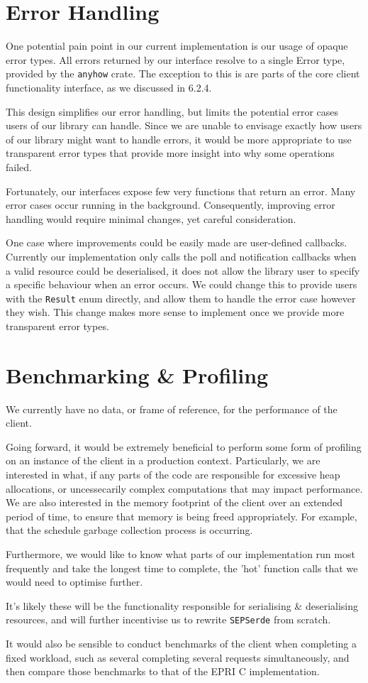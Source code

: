 \section{Error Handling}
One potential pain point in our current implementation is our usage of opaque error types. All errors returned by our interface resolve to a single Error type, provided by the \texttt{anyhow} crate. The exception to this is are parts of the core client functionality interface, as we discussed in 6.2.4.

This design simplifies our error handling, but limits the potential error cases users of our library can handle. Since we are unable to envisage exactly how users of our library might want to handle errors, it would be more appropriate to use transparent error types that provide more insight into why some operations failed.

Fortunately, our interfaces expose few very functions that return an error. Many error cases occur running in the background. Consequently, improving error handling would require minimal changes, yet careful consideration.

One case where improvements could be easily made are user-defined callbacks. Currently our implementation only calls the poll and notification callbacks when a valid resource could be deserialised, it does not allow the library user to specify a specific behaviour when an error occurs. We could change this to provide users with the \texttt{Result} enum directly, and allow them to handle the error case however they wish. This change makes more sense to implement once we provide more transparent error types.   

\section{Benchmarking \& Profiling}
We currently have no data, or frame of reference, for the performance of the client. 

Going forward, it would be extremely beneficial to perform some form of profiling on an instance of the client in a production context. Particularly, we are interested in what, if any parts of the code are responsible for excessive heap allocations, or uncessecarily complex computations that may impact performance.
We are also interested in the memory footprint of the client over an extended period of time, to ensure that memory is being freed appropriately. For example, that the schedule garbage collection process is occurring. 

Furthermore, we would like to know what parts of our implementation run most frequently and take the longest time to complete, the 'hot' function calls that we would need to optimise further. 

It's likely these will be the functionality responsible for serialising \& deserialising resources, and will further incentivise us to rewrite \texttt{SEPSerde} from scratch.

It would also be sensible to conduct benchmarks of the client when completing a fixed workload, such as several completing several requests simultaneously, and then compare those benchmarks to that of the EPRI C implementation.

